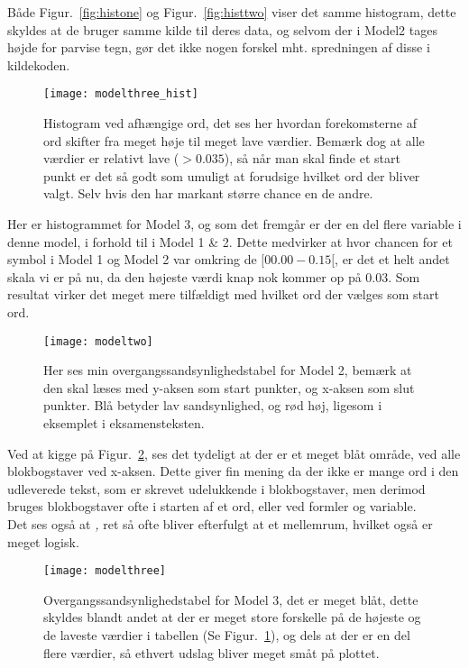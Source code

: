 \documentclass[11pt]{article} %
\begin{document}
Både Figur.~\ref{fig:histone} og Figur.~\ref{fig:histtwo} viser det samme histogram, dette skyldes at de bruger samme kilde til deres data, og selvom der i Model2 tages højde for parvise tegn, gør det ikke nogen forskel mht. spredningen af disse i kildekoden. 

\newpage 

\begin{figure}[h!]
\centering
  \texttt{[image: modelthree\_hist]}
  \caption{Histogram ved afhængige ord, det ses her hvordan forekomsterne af ord skifter fra meget høje til meget lave værdier. Bemærk dog at alle værdier er relativt lave ($>0.035$), så når man skal finde et start punkt er det så godt som umuligt at forudsige hvilket ord der bliver valgt. Selv hvis den har markant større chance en de andre.}
  \label{fig:histthree}
\end{figure}

Her er histogrammet for Model 3, og som det fremgår er der en del flere variable i denne model, i forhold til i Model 1 \& 2. Dette medvirker at hvor chancen for et symbol i Model 1 og Model 2 var omkring de $[00.00 - 0.15[$, er det et helt andet skala vi er på nu, da den højeste værdi knap nok kommer op på $0.03$. Som resultat virker det meget mere tilfældigt med hvilket ord der vælges som start ord.

\newpage 

\begin{figure}[h!]
\centering
  \texttt{[image: modeltwo]}
  \caption{Her ses min overgangssandsynlighedstabel for Model 2, bemærk at den skal læses med y-aksen som start punkter, og x-aksen som slut punkter. Blå betyder lav sandsynlighed, og rød høj, ligesom i eksemplet i eksamensteksten.}
  \label{fig:modeltwo}
\end{figure}

Ved at kigge på Figur.~\ref{fig:modeltwo}, ses det tydeligt at der er et meget blåt område, ved alle blokbogstaver ved x-aksen. Dette giver fin mening da der ikke er mange ord i den udleverede tekst, som er skrevet udelukkende i blokbogstaver, men derimod bruges blokbogstaver ofte i starten af et ord, eller ved formler og variable.\\
Det ses også at \textit{,} ret så ofte bliver efterfulgt at et mellemrum, hvilket også er meget logisk.
\newpage
\begin{figure}[h!]
\centering
  \texttt{[image: modelthree]}
  \caption{Overgangssandsynlighedstabel for Model 3, det er meget blåt, dette skyldes blandt andet at der er meget store forskelle på de højeste og de laveste værdier i tabellen (Se Figur.~\ref{fig:histthree}), og dels at der er en del flere værdier, så ethvert udslag bliver meget småt på plottet.}
  \label{fig:modelthree}
\end{figure}
\end{document}
